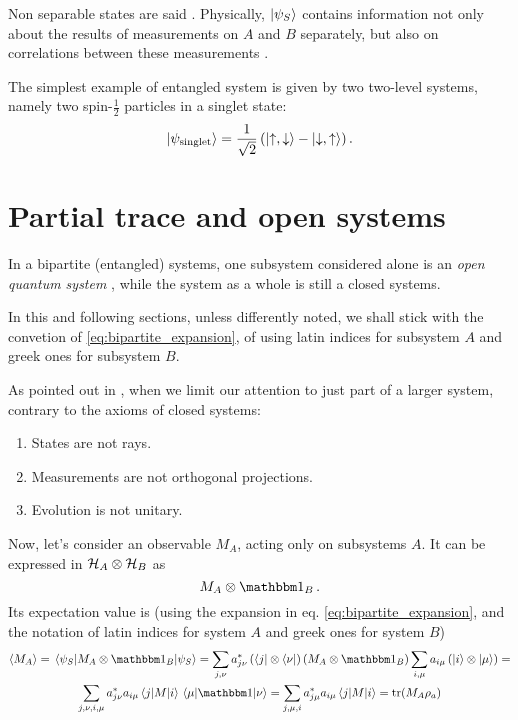 Non separable states are said .
Physically,
$\ket{\psi_S}$ contains information
not only about the results of measurements on $A$ and $B$ separately,
but also on correlations between these measurements
\parencite{Haroche_Exploring}.

The simplest example of entangled system is given by two two-level systems,
namely two spin-$\frac{1}{2}$ particles in a singlet state:
\[
  \ket{\psi_{\text{singlet}}} = \frac{1}{\sqrt{2}} \left(\ket{\uparrow, \downarrow} - \ket{\downarrow, \uparrow}\right).
\]

\section{Partial trace and open systems}

In a bipartite (entangled) systems, one subsystem considered alone is an
\emph{open quantum system} \parencite{open_systems},
while the system as a whole is still a closed systems.

In this and following sections, unless differently noted,
we shall stick with the convetion of \eqref{eq:bipartite_expansion},
of using
latin indices for subsystem $A$ and greek ones for subsystem $B$.

As pointed out in
\cite[sec. 2.3.1]{PreskillNotes}, when we limit our attention to
just part of a larger system, contrary to the axioms of closed systems:
\begin{enumerate}
  \item States are not rays.
  \item Measurements are not orthogonal projections.
  \item Evolution is not unitary.
\end{enumerate}

Now, let's consider an observable $M_A$, acting only on subsystems $A$.
It can be expressed in $\mathcal{H}_A \otimes \mathcal{H}_B$ as
\[
  M_A \otimes \idop_B\, .
\]
Its expectation value is
(using the expansion in eq. \ref{eq:bipartite_expansion},
and the notation of latin indices for system $A$ and greek ones for system $B$)
\begin{multline}\label{exp_subsys}
  \expval{M_A} = \matrixel{\psi_S}{M_A\otimes\idop_B}{\psi_S} =
  \sum_{j,\nu}a^{*}_{j\nu}\left(\bra{j}\otimes\bra{\nu}\right)\left(M_A\otimes\idop_B\right)\sum_{i,\mu}a_{i\mu}\left(\ket{i}\otimes\ket{\mu}\right) = \\
  \sum_{j,\nu,i,\mu}a^{*}_{j\nu}a_{i\mu}\matrixel{j}{M}{i}\matrixel{\mu}{\idop}{\nu} =
  \sum_{j,\mu,i}a^{*}_{j\mu}a_{i\mu}\matrixel{j}{M}{i} =
  \tr(M_A\rho_a)
\end{multline}

